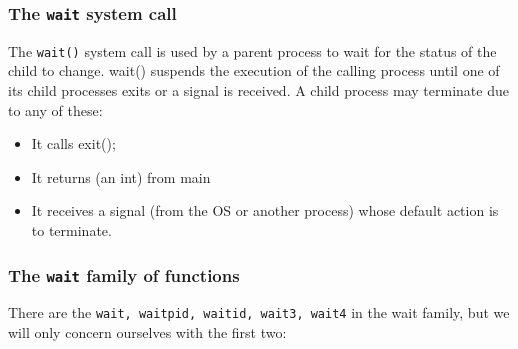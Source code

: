 \documentclass[a4paper]{article}
\begin{document}
\subsubsection{The \texttt{wait} system call}
The \texttt{wait()} system call is used by a parent process to wait for the status of the child to change. wait() suspends the execution of the calling process until one of its child processes exits or a signal is received. A child process may terminate due to any of these:
\begin{itemize}
    \item It calls exit();
    \item It returns (an int) from main
    \item It receives a signal (from the OS or another process) whose default action is to terminate. 
\end{itemize}


\subsubsection{The \texttt{wait} family of functions}
There are the \texttt{wait, waitpid, waitid, wait3, wait4} in the wait family, but we will only concern ourselves with the first two:
\end{document}
